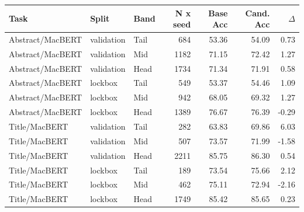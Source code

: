 \small
\setlength{\tabcolsep}{3.5pt}
\begin{tabular}{@{}lllrrrr@{}}
\toprule
Task & Split & Band & N x seed & Base Acc & Cand. Acc & $\Delta$ \\
\midrule
Abstract/MacBERT & validation & Tail & 684 & 53.36 & 54.09 & 0.73 \\
Abstract/MacBERT & validation & Mid & 1182 & 71.15 & 72.42 & 1.27 \\
Abstract/MacBERT & validation & Head & 1734 & 71.34 & 71.91 & 0.58 \\
Abstract/MacBERT & lockbox & Tail & 549 & 53.37 & 54.46 & 1.09 \\
Abstract/MacBERT & lockbox & Mid & 942 & 68.05 & 69.32 & 1.27 \\
Abstract/MacBERT & lockbox & Head & 1389 & 76.67 & 76.39 & -0.29 \\
Title/MacBERT & validation & Tail & 282 & 63.83 & 69.86 & 6.03 \\
Title/MacBERT & validation & Mid & 507 & 73.57 & 71.99 & -1.58 \\
Title/MacBERT & validation & Head & 2211 & 85.75 & 86.30 & 0.54 \\
Title/MacBERT & lockbox & Tail & 189 & 73.54 & 75.66 & 2.12 \\
Title/MacBERT & lockbox & Mid & 462 & 75.11 & 72.94 & -2.16 \\
Title/MacBERT & lockbox & Head & 1749 & 85.42 & 85.65 & 0.23 \\
\bottomrule
\end{tabular}
